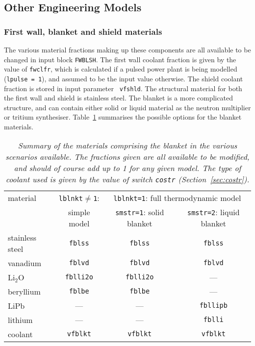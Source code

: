 \documentclass[11pt,a4paper]{report}
\begin{document}
\subsection{Other Engineering Models}

\subsubsection{First wall, blanket and shield materials}
\label{sec:fwbs}

The various material fractions making up these components are all available to
be changed in input block {\tt FWBLSH}. The first wall coolant fraction is
given by the value of {\tt fwclfr}, which is calculated if a pulsed power
plant is being modelled ({\tt lpulse = 1}), and assumed to be the input value
otherwise. The shield coolant fraction is stored in input parameter {\tt
vfshld}. The structural material for both the first wall and shield is
stainless steel. The blanket is a more complicated structure, and can contain
either solid or liquid material as the neutron multiplier or tritium
synthesiser. Table~\ref{tab:blanket} summarises the possible options for the
blanket materials.


\begin{table}
\begin{center}

\begin{tabular}{||l||c||c||c||} \hline
material & {\tt lblnkt$\not=$1}: & \multicolumn{2}{c||}{{\tt lblnkt=1}: full
thermodynamic model} \\ \cline{3-4}
 & simple model & {\tt smstr=1}: solid blanket & {\tt smstr=2}: liquid blanket
\\ \hline
stainless steel & {\tt fblss}   & {\tt fblss}   & {\tt fblss}   \\
vanadium        & {\tt fblvd}   & {\tt fblvd}   & {\tt fblvd}   \\
Li$_2$O         & {\tt fblli2o} & {\tt fblli2o} &     ---       \\
beryllium       & {\tt fblbe}   & {\tt fblbe}   &     ---       \\
LiPb            &     ---       &     ---       & {\tt fbllipb} \\
lithium         &     ---       &     ---       & {\tt fblli}   \\
coolant         & {\tt vfblkt}  & {\tt vfblkt}  & {\tt vfblkt}  \\ \hline
\end{tabular}
\end{center}
\caption[TABLE_BKT]{{\it
Summary of the materials comprising the blanket in the various scenarios
available. The fractions given are all available to be modified, and should
of course add up to 1 for any given model. The type of coolant used is given
by the value of switch {\tt costr} (Section~\ref{sec:costr}).
}}
\label{tab:blanket}
\end{table}
\end{document}
